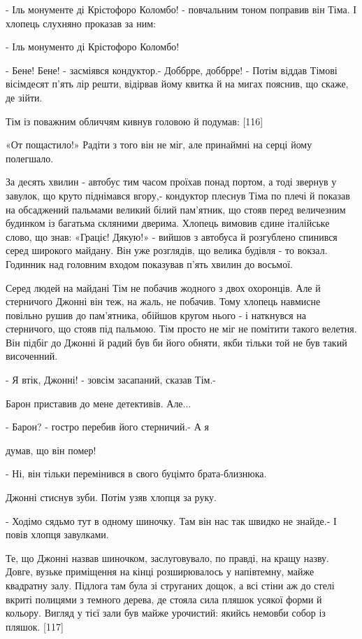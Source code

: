 - Іль монументе ді Крістофоро Коломбо! - повчальним тоном поправив він Тіма. І хлопець слухняно проказав за ним:

- Іль монументо ді Крістофоро Коломбо!

- Бене! Бене! - засміявся кондуктор.- Доббрре, доббрре! - Потім віддав Тімові вісімдесят п'ять лір решти, відірвав йому квитка й на мигах пояснив, що скаже, де зійти.

Тім із поважним обличчям кивнув головою й подумав: [116]

«От пощастило!» Радіти з того він не міг, але принаймні на серці йому полегшало.

За десять хвилин - автобус тим часом проїхав понад портом, а тоді звернув у завулок, що круто піднімався вгору,- кондуктор плеснув Тіма по плечі й показав на обсаджений пальмами великий білий пам'ятник, що стояв перед величезним будинком із багатьма скляними дверима. Хлопець вимовив єдине італійське слово, що знав: «Граціє! Дякую!» - вийшов з автобуса й розгублено спинився серед широкого майдану. Він уже розглядів, що велика будівля - то вокзал. Годинник над головним входом показував п'ять хвилин до восьмої.

Серед людей на майдані Тім не побачив жодного з двох охоронців. Але й стерничого Джонні він теж, на жаль, не побачив. Тому хлопець навмисне повільно рушив до пам'ятника, обійшов кругом нього - і наткнувся на стерничого, що стояв під пальмою. Тім просто не міг не помітити такого велетня. Він підбіг до Джонні й радий був би його обняти, якби тільки той не був такий височенний.

- Я втік, Джонні! - зовсім засапаний, сказав Тім.-

Барон приставив до мене детективів. Але...

- Барон? - гостро перебив його стерничий.- А я

думав, що він помер!

- Ні, він тільки перемінився в свого буцімто брата-близнюка.

Джонні стиснув зуби. Потім узяв хлопця за руку.

- Ходімо сядьмо тут в одному шиночку. Там він нас так швидко не знайде.- І повів хлопця завулками.

Те, що Джонні назвав шиночком, заслуговувало, по правді, на кращу назву. Довге, вузьке приміщення на кінці розширювалось у напівтемну, майже квадратну залу. Підлога там була зі струганих дощок, а всі стіни аж до стелі вкриті полицями з темного дерева, де стояла сила пляшок усякої форми й кольору. Вигляд у тієї зали був майже урочистий: якийсь немовби собор із пляшок. [117]

